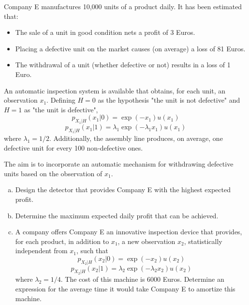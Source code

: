 \begin{prob}
\label{RealProb}

Company E manufactures 10,000 units of a product daily. It has been estimated that:
\begin{itemize}
\item The sale of a unit in good condition nets a profit of 3 Euros.
\item Placing a defective unit on the market causes (on average) a loss of 81 Euros.
\item The withdrawal of a unit (whether defective or not) results in a loss of 1 Euro.
\end{itemize}

An automatic inspection system is available that obtains, for each unit, an observation $x_1$. Defining $H=0$ as the hypothesis "the unit is not defective" and $H=1$ as "the unit is defective",
\begin{equation}
p_{X_1|H}(x_1|0) = \exp(-x_1)u(x_1)
\end{equation}
\begin{equation}
p_{X_1|H}(x_1|1) = \lambda_1 \exp(-\lambda_1 x_1)u(x_1)
\end{equation}
where $\lambda_1=1/2$. Additionally, the assembly line produces, on average, one defective unit for every 100 non-defective ones.
    
The aim is to incorporate an automatic mechanism for withdrawing defective units based on the observation of $x_1$.

\begin{enumerate}[a)]
\item Design the detector that provides Company E with the highest expected profit.
\item Determine the maximum expected daily profit that can be achieved.
\item A company offers Company E an innovative inspection device that provides, for each product, in addition to $x_1$, a new observation $x_2$, statistically independent from $x_1$, such that
\begin{equation}
p_{X_2|H}(x_2|0) = \exp(-x_2)u(x_2)
\end{equation}
\begin{equation}
p_{X_2|H}(x_2|1) = \lambda_2 \exp(-\lambda_2 x_2)u(x_2)
\end{equation}
where $\lambda_2 = 1/4$. The cost of this machine is 6000 Euros. Determine an expression for the {average time} it would take Company E to amortize this machine.
\end{enumerate}
\end{prob}
